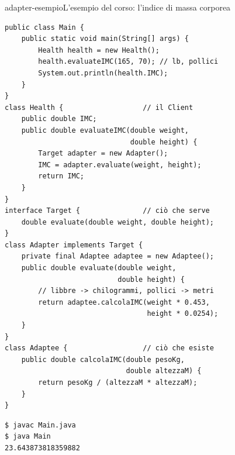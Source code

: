 \begin{programma}{adapter-esempio}{L'esempio del corso: l'indice di massa corporea}
\begin{lstlisting}[style=javacs, name=Main.java]
public class Main {
    public static void main(String[] args) {
        Health health = new Health();
        health.evaluateIMC(165, 70); // lb, pollici
        System.out.println(health.IMC);
    }
}
class Health {                   // il Client
    public double IMC;
    public double evaluateIMC(double weight,
                              double height) {
        Target adapter = new Adapter();
        IMC = adapter.evaluate(weight, height);
        return IMC;
    }
}
interface Target {               // ciò che serve
    double evaluate(double weight, double height);
}
class Adapter implements Target {
    private final Adaptee adaptee = new Adaptee();
    public double evaluate(double weight,
                           double height) {
        // libbre -> chilogrammi, pollici -> metri
        return adaptee.calcolaIMC(weight * 0.453,
                                  height * 0.0254);
    }
}
class Adaptee {                  // ciò che esiste
    public double calcolaIMC(double pesoKg,
                             double altezzaM) {
        return pesoKg / (altezzaM * altezzaM);
    }
}
\end{lstlisting}
\tcblower
{}

\medskip
\begin{lstlisting}[style=shellcs, name=Terminale]
$ javac Main.java
$ java Main
23.643873818359882
\end{lstlisting}
\end{programma}

